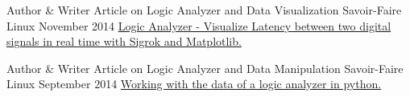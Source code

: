

\begin{cventries}

  \cventry
    {Author \& Writer} %
    {Article on Logic Analyzer and Data Visualization} %
    {Savoir-Faire Linux} %
    {November 2014} %
    {
      \href{https://blog.savoirfairelinux.com/en-ca/2014/logic-analyzer-visualize-latency-with-sigrok-and-matplotlib/}{Logic Analyzer - Visualize Latency between two digital signals in real time with Sigrok and Matplotlib. \faExternalLink}
    }

  \cventry
    {Author \& Writer} %
    {Article on Logic Analyzer and Data Manipulation} %
    {Savoir-Faire Linux} %
    {September 2014} %
    {
      \href{https://blog.savoirfairelinux.com/fr-ca/2014/travailler-donnees-saleae-en-python/}{Working with the data of a logic analyzer in python. \faExternalLink}
    }

\end{cventries}
